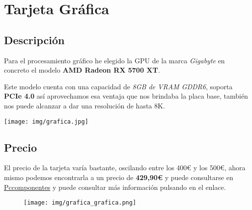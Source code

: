 \documentclass{article}
\begin{document}
  \newpage
    \section{Tarjeta Gráfica}
      \subsection{Descripción}
        Para el procesamiento gráfico he elegido la GPU de la marca \textit{Gigabyte} en concreto el modelo \textbf{AMD Radeon RX 5700 XT}.
        \\
        \begin{minipage}{0.5\textwidth}
         Este modelo cuenta con una capacidad de \textit{8GB de VRAM GDDR6}, soporta \textbf{PCIe 4.0} así aprovechamos esa ventaja que nos brindaba la placa base, también nos puede alcanzar a dar una resolución de hasta 8K.
        \end{minipage}
        \begin{minipage}{\textwidth}
          \texttt{[image: img/grafica.jpg]}
        \end{minipage}
      \subsection{Precio}
        El precio de la tarjeta varía bastante, oscilando entre los 400€ y los 500€, ahora mismo podemos encontrarla a un precio de 
        \textbf{429,90€} y puede consultarse en 
        \href{https://www.pccomponentes.com/gigabyte-amd-radeon-rx-5700-xt-gaming-oc-8gb-gddr6}{Pccomponentes} y puede consultar más información pulsando en el enlace.
        \\
        \begin{figure}[h]
          \centering
          \texttt{[image: img/grafica\_grafica.png]}
        \end{figure}
          


          
\end{document}
